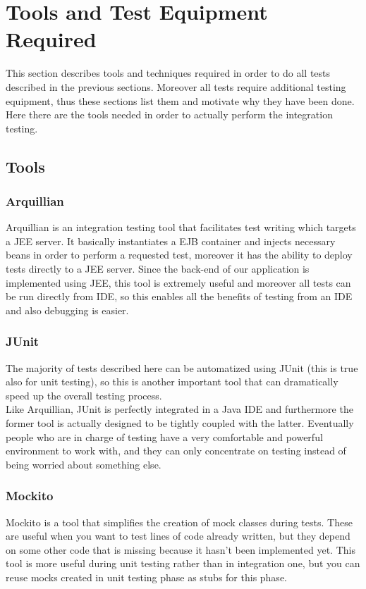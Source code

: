 \newpage
\section{Tools and Test Equipment Required}
This section describes tools and techniques required in order to do all tests described in the previous sections. Moreover all tests require additional testing equipment, thus these sections list them and motivate why they have been done. \\
Here there are the tools needed in order to actually perform the integration testing.

\subsection{Tools}

\subsubsection{Arquillian}
Arquillian is an integration testing tool that facilitates test writing which targets a JEE server. It basically instantiates a EJB container and injects necessary beans in order to perform a requested test, moreover it has the ability to deploy tests directly to a JEE server. Since the back-end of our application is implemented using JEE, this tool is extremely useful and moreover all tests can be run directly from IDE, so this enables all the benefits of testing from an IDE and also debugging is easier.

\subsubsection{JUnit}
The majority of tests described here can be automatized using JUnit (this is true also for unit testing), so this is another important tool that can dramatically speed up the overall testing process. \\ Like Arquillian, JUnit is perfectly integrated in a Java IDE and furthermore the former tool is actually designed to be tightly coupled with the latter. Eventually people who are in charge of testing have a very comfortable and powerful environment to work with, and they can only concentrate on testing instead of being worried about something else. 

\subsubsection{Mockito}
Mockito is a tool that simplifies the creation of mock classes during tests. These are useful when you want to test lines of code already written, but they depend on some other code that is missing because it hasn't been implemented yet. This tool is more useful during unit testing rather than in integration one, but you can reuse mocks created in unit testing phase as stubs for this phase.

